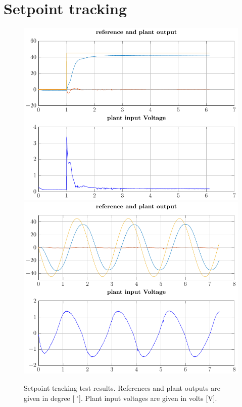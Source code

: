 \documentclass[ twoside,openright,titlepage,numbers=noenddot,headinclude,%
                footinclude=true,cleardoublepage=empty,abstractoff, %
                BCOR=5mm,paper=a4,fontsize=11pt,%
                ngerman,american,%
                ]{scrreprt}
\begin{document}
{\section{Setpoint tracking}
\begin{figure}
%
%
\includegraphics[scale = 0.46]{images/optimizedStepLab.pdf}
\includegraphics[scale = 0.46]{images/optimizedSineLab.pdf}
\caption{Setpoint tracking test results. References and plant outputs are given in degree [$\;^\circ$]. Plant input voltages are given in volts [V].}

\end{figure}}
\end{document}
